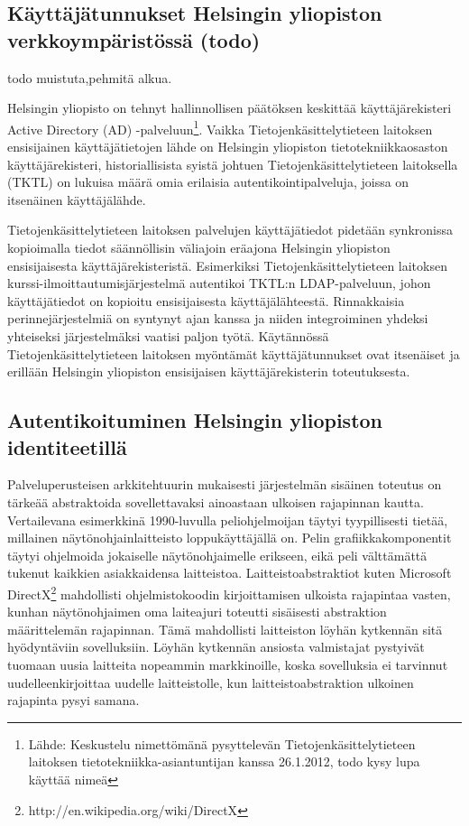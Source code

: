 \documentclass[finnish,gradu]{tktltiki}
\begin{document}
  \subsection{Käyttäjätunnukset Helsingin yliopiston verkkoympäristössä (todo)} %
  \label{sub:autentikointi_helsingin_yliopiston_verkkoympäristössä}

  todo muistuta,pehmitä alkua.

  Helsingin yliopisto on tehnyt hallinnollisen päätöksen keskittää käyttäjärekisteri Active Directory (AD) -palveluun\footnote{Lähde: Keskustelu nimettömänä pysyttelevän Tietojenkäsittelytieteen laitoksen tietotekniikka-asiantuntijan kanssa 26.1.2012, todo kysy lupa käyttää nimeä}. Vaikka Tietojenkäsittelytieteen laitoksen ensisijainen käyttäjätietojen lähde on Helsingin yliopiston tietotekniikkaosaston käyttäjärekisteri, historiallisista syistä johtuen Tietojenkäsittelytieteen laitoksella (TKTL) on lukuisa määrä omia erilaisia autentikointipalveluja, joissa on itsenäinen käyttäjälähde.

  Tietojenkäsittelytieteen laitoksen palvelujen käyttäjätiedot pidetään synkronissa kopioimalla tiedot säännöllisin väliajoin eräajona Helsingin yliopiston ensisijaisesta käyttäjärekisteristä. Esimerkiksi Tietojenkäsittelytieteen laitoksen kurssi-ilmoittautumisjärjestelmä autentikoi TKTL:n LDAP-palveluun, johon käyttäjätiedot on kopioitu ensisijaisesta käyttäjälähteestä. Rinnakkaisia perinnejärjestelmiä on syntynyt ajan kanssa ja niiden integroiminen yhdeksi yhteiseksi järjestelmäksi vaatisi paljon työtä. Käytännössä Tietojenkäsittelytieteen laitoksen myöntämät käyttäjätunnukset ovat itsenäiset ja erillään Helsingin yliopiston ensisijaisen käyttäjärekisterin toteutuksesta.


  \subsection{Autentikoituminen Helsingin yliopiston identiteetillä} %
  \label{sub:autentikointi_helsingin_yliopiston_id}

  Palveluperusteisen arkkitehtuurin mukaisesti järjestelmän sisäinen toteutus on tärkeää abstraktoida sovellettavaksi ainoastaan ulkoisen rajapinnan kautta. Vertailevana esimerkkinä 1990-luvulla peliohjelmoijan täytyi tyypillisesti tietää, millainen näytönohjainlaitteisto loppukäyttäjällä on. Pelin grafiikkakomponentit täytyi ohjelmoida jokaiselle näytönohjaimelle erikseen, eikä peli välttämättä tukenut kaikkien asiakkaidensa laitteistoa. Laitteistoabstraktiot kuten Microsoft DirectX\footnote{http://en.wikipedia.org/wiki/DirectX} mahdollisti ohjelmistokoodin kirjoittamisen ulkoista rajapintaa vasten, kunhan näytönohjaimen oma laiteajuri toteutti sisäisesti abstraktion määrittelemän rajapinnan. Tämä mahdollisti laitteiston löyhän kytkennän sitä hyödyntäviin sovelluksiin. Löyhän kytkennän ansiosta valmistajat pystyivät tuomaan uusia laitteita nopeammin markkinoille, koska sovelluksia ei tarvinnut uudelleenkirjoittaa uudelle laitteistolle, kun laitteistoabstraktion ulkoinen rajapinta pysyi samana.
\end{document}
